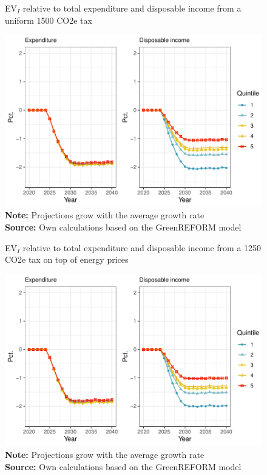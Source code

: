 \begin{figure}[H]
\centering
\caption{EV$_I$ relative to total expenditure and disposable income from a uniform 1500 CO2e tax}
\label{tax1_EV}
\includegraphics[width=.9\textwidth]{Figures/EV_tax1.pdf}
\captionsetup{singlelinecheck=off,size=scriptsize}
\setlength{\captionmargin}{10pt}
\caption*{
\textbf{Note:} Projections grow with the average growth rate\\
\textbf{Source:} Own calculations based on the GreenREFORM model}
\end{figure}

\begin{figure}[H]
\centering
\caption{EV$_I$ relative to total expenditure and disposable income from a 1250 CO2e tax on top of energy prices}
\label{tax2_EV}
\includegraphics[width=.9\textwidth]{Figures/EV_tax2.pdf}
\captionsetup{singlelinecheck=off,size=scriptsize}
\setlength{\captionmargin}{10pt}
\caption*{
\textbf{Note:} Projections grow with the average growth rate\\
\textbf{Source:} Own calculations based on the GreenREFORM model}
\end{figure}

